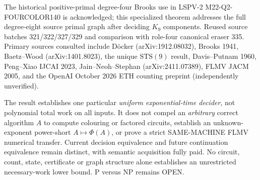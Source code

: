 \documentclass[11pt]{article}
\begin{document}
The historical positive-primal degree-four Brooks use in LSPV-2 M22-Q2-FOURCOLOR140 is acknowledged; this specialized theorem addresses the full degree-eight source primal graph after deciding $K_9$ components. Reused source batches 321/322/327/329 and comparison with role-four canonical eraser 335. Primary sources consulted include D\"ocker (arXiv:1912.08032), Brooks 1941, Baetz--Wood (arXiv:1401.8023), the unique $\mathrm{STS}(9)$ result, Davis--Putnam 1960, Peng--Xiao IJCAI 2023, Jain--Neoh--Stephan (arXiv:2411.07389), FLMV JACM 2005, and the OpenAI October 2026 ETH counting preprint (independently unverified).

The result establishes one particular \emph{uniform exponential-time decider}, not polynomial total work on all inputs. It does not compel an \emph{arbitrary} correct algorithm $A$ to compute colouring or factored circuits, establish an unknown-exponent power-short $A\mapsto\Phi(A)$, or prove a strict SAME-MACHINE FLMV numerical transfer. Current decision equivalence and future continuation equivalence remain distinct, with semantic acquisition fully paid. No circuit, count, state, certificate or graph structure alone establishes an unrestricted necessary-work lower bound. P versus NP remains OPEN.
\end{document}
